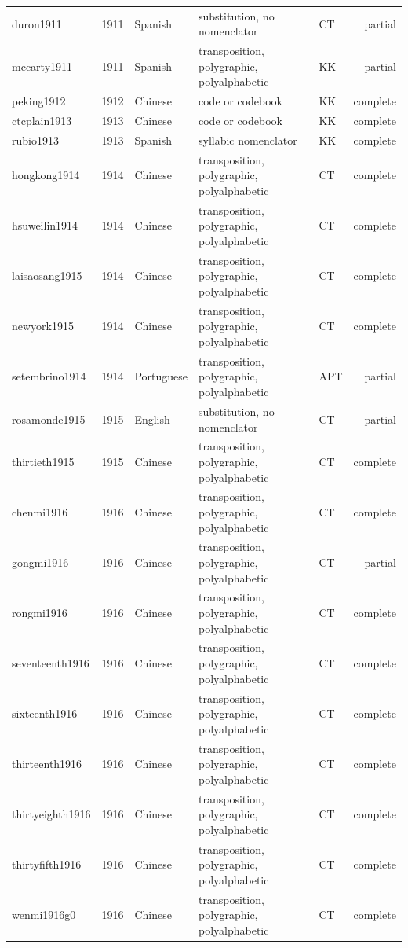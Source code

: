 {\begin{longtable}{@{}lrlllr@{}}
duron1911 & 1911 & Spanish & substitution, no nomenclator & CT & partial \\
mccarty1911 & 1911 & Spanish & transposition, polygraphic, polyalphabetic & KK & partial \\
peking1912 & 1912 & Chinese & code or codebook & KK & complete \\
ctcplain1913 & 1913 & Chinese & code or codebook & KK & complete \\
rubio1913 & 1913 & Spanish & syllabic nomenclator & KK & complete \\
hongkong1914 & 1914 & Chinese & transposition, polygraphic, polyalphabetic & CT & complete \\
hsuweilin1914 & 1914 & Chinese & transposition, polygraphic, polyalphabetic & CT & complete \\
laisaosang1915 & 1914 & Chinese & transposition, polygraphic, polyalphabetic & CT & complete \\
newyork1915 & 1914 & Chinese & transposition, polygraphic, polyalphabetic & CT & complete \\
setembrino1914 & 1914 & Portuguese & transposition, polygraphic, polyalphabetic & APT & partial \\
rosamonde1915 & 1915 & English & substitution, no nomenclator & CT & partial \\
thirtieth1915 & 1915 & Chinese & transposition, polygraphic, polyalphabetic & CT & complete \\
chenmi1916 & 1916 & Chinese & transposition, polygraphic, polyalphabetic & CT & complete \\
gongmi1916 & 1916 & Chinese & transposition, polygraphic, polyalphabetic & CT & partial \\
rongmi1916 & 1916 & Chinese & transposition, polygraphic, polyalphabetic & CT & complete \\
seventeenth1916 & 1916 & Chinese & transposition, polygraphic, polyalphabetic & CT & complete \\
sixteenth1916 & 1916 & Chinese & transposition, polygraphic, polyalphabetic & CT & complete \\
thirteenth1916 & 1916 & Chinese & transposition, polygraphic, polyalphabetic & CT & complete \\
thirtyeighth1916 & 1916 & Chinese & transposition, polygraphic, polyalphabetic & CT & complete \\
thirtyfifth1916 & 1916 & Chinese & transposition, polygraphic, polyalphabetic & CT & complete \\
wenmi1916g0 & 1916 & Chinese & transposition, polygraphic, polyalphabetic & CT & complete \\

\end{longtable}}
